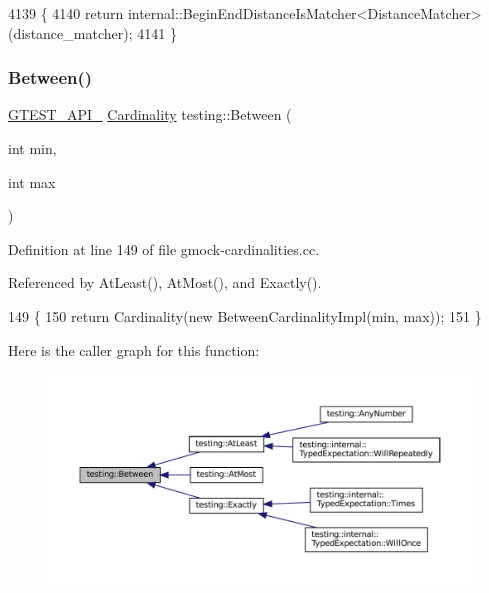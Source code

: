 \begin{DoxyCode}
4139                                                             \{
4140   \textcolor{keywordflow}{return} internal::BeginEndDistanceIsMatcher<DistanceMatcher>(distance\_matcher);
4141 \}
\end{DoxyCode}
\mbox{\label{namespacetesting_a3bb2d3cdd3fdf5b4be1480fce549918e}} 
\subsubsection{\texorpdfstring{Between()}{Between()}}
{\footnotesize\ttfamily \hyperlink{gtest-port_8h_aa73be6f0ba4a7456180a94904ce17790}{G\+T\+E\+S\+T\+\_\+\+A\+P\+I\+\_\+} \hyperlink{classtesting_1_1Cardinality}{Cardinality} testing\+::\+Between (\begin{DoxyParamCaption}\item[{int}]{min,  }\item[{int}]{max }\end{DoxyParamCaption})}



Definition at line 149 of file gmock-\/cardinalities.\+cc.



Referenced by At\+Least(), At\+Most(), and Exactly().


\begin{DoxyCode}
149                                                  \{
150   \textcolor{keywordflow}{return} Cardinality(\textcolor{keyword}{new} BetweenCardinalityImpl(min, max));
151 \}
\end{DoxyCode}
Here is the caller graph for this function\+:
\nopagebreak
\begin{figure}[H]
\begin{center}
\leavevmode
\includegraphics[width=350pt]{namespacetesting_a3bb2d3cdd3fdf5b4be1480fce549918e_icgraph}
\end{center}
\end{figure}
\mbox{\label{namespacetesting_acaa432211a3aec62e3d0f24b47bd2dae}} 
